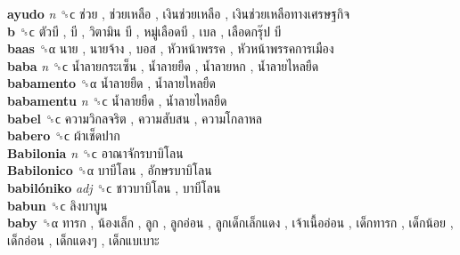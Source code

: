 \textbf{ayudo} \emph{n}  ␝ϲ   ช่วย ,  ช่วยเหลือ ,  เงินช่วยเหลือ ,  เงินช่วยเหลือทางเศรษฐกิจ   \\
\textbf{b} ␝ϲ   ตัวบี ,  บี ,  วิตามิน บี ,  หมู่เลือดบี ,  เบล ,  เลือดกรุ๊ป บี   \\
\textbf{baas} ␝α   นาย ,  นายจ้าง ,  บอส ,  หัวหน้าพรรค ,  หัวหน้าพรรคการเมือง   \\
\textbf{baba} \emph{n}  ␝ϲ   น้ำลายกระเซ็น ,  น้ำลายยืด ,  น้ำลายหก ,  น้ำลายไหลยืด   \\
\textbf{babamento} ␝α   น้ำลายยืด ,  น้ำลายไหลยืด   \\
\textbf{babamentu} \emph{n}  ␝ϲ   น้ำลายยืด ,  น้ำลายไหลยืด   \\
\textbf{babel} ␝ϲ   ความวิกลจริต ,  ความสับสน ,  ความโกลาหล   \\
\textbf{babero} ␝ϲ   ผ้าเช็ดปาก   \\
\textbf{Babilonia} \emph{n}  ␝ϲ   อาณาจักรบาบิโลน   \\
\textbf{Babilonico} ␝α   บาบีโลน ,  อักษรบาบิโลน   \\
\textbf{babilóniko} \emph{adj}  ␝ϲ   ชาวบาบิโลน ,  บาบีโลน   \\
\textbf{babun} ␝ϲ   ลิงบาบูน   \\
\textbf{baby} ␝α   ทารก ,  น้องเล็ก ,  ลูก ,  ลูกอ่อน ,  ลูกเด็กเล็กแดง ,  เจ้าเนื้ออ่อน ,  เด็กทารก ,  เด็กน้อย ,  เด็กอ่อน ,  เด็กแดงๆ ,  เด็กแบเบาะ   \\
